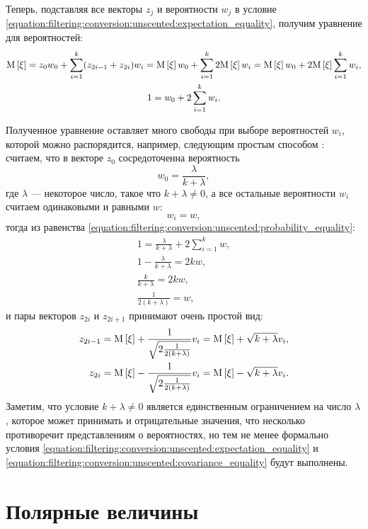 Теперь, подставляя все векторы $z_j$ и вероятности $w_j$ в условие \eqref{equation:filtering:conversion:unscented:expectation_equality}, получим уравнение для
вероятностей:
\begin{gather}
    \mathrm{M} \left [ \xi \right ]
        = z_0 w_0 + \sum_{i=1}^{k} ( z_{2i-1} + z_{2i} ) w_i
        = \mathrm{M} \left [ \xi \right ] w_0 + \sum_{i=1}^{k} 2 \mathrm{M} \left [ \xi \right ] w_i
        = \mathrm{M} \left [ \xi \right ]  w_0 + 2 \mathrm{M} \left [ \xi \right ] \sum_{i=1}^{k} w_i ,
        \notag \\
    1 = w_0 + 2 \sum_{i=1}^{k} w_i .
        \label{equation:filtering:conversion:unscented:probability_equality}
\end{gather}

Полученное уравнение оставляет много свободы при выборе вероятностей $w_i$, которой можно распорядится, например, следующим простым способом \cite{UKF,UT}: считаем, что в
векторе $z_0$ сосредоточенна вероятность
$$
    w_0 = \frac{\lambda}{k + \lambda} ,
$$
где $\lambda$ --- некоторое число, такое что $k+\lambda \neq 0$, а все остальные вероятности $w_i$ считаем одинаковыми и равными $w$:
$$
    w_i = w,
$$
тогда из равенства \eqref{equation:filtering:conversion:unscented:probability_equality}:
\begin{gather*}
    1 = \frac{\lambda}{k + \lambda} + 2 \sum_{i=1}^{k} w , \\
    1 - \frac{\lambda}{k + \lambda} = 2 k w , \\
    \frac{k}{k + \lambda} = 2 k w , \\
    \frac{1}{2(k + \lambda)} = w ,
\end{gather*}
и пары векторов $z_{2i}$ и $z_{2i+1}$ принимают очень простой вид:
\begin{align*}
    z_{2i-1} &
        = \mathrm{M} \left [ \xi \right ] + \frac{1}{\sqrt{2 \frac{1}{2(k + \lambda)}}} v_i
        = \mathrm{M} \left [ \xi \right ] + \sqrt{k + \lambda} v_i, \\
    z_{2i} &
        = \mathrm{M} \left [ \xi \right ] - \frac{1}{\sqrt{2 \frac{1}{2(k + \lambda)}}} v_i
        = \mathrm{M} \left [ \xi \right ] - \sqrt{k + \lambda} v_i .
\end{align*}
Заметим, что условие $k + \lambda \neq 0$ является единственным ограничением на число $\lambda$, которое может принимать и отрицательные значения, что несколько
противоречит представлениям о вероятностях, но тем не менее формально условия \eqref{equation:filtering:conversion:unscented:expectation_equality} и
\eqref{equation:filtering:conversion:unscented:covariance_equality} будут выполнены.

\section{Полярные величины}

